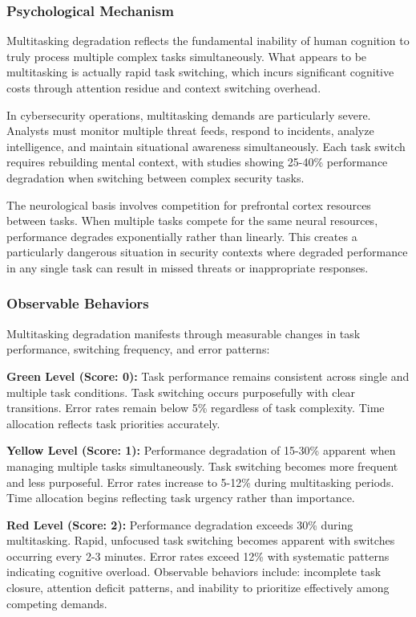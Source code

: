 \documentclass[11pt,a4paper]{article}
\begin{document}
\subsubsection{Psychological Mechanism}

Multitasking degradation reflects the fundamental inability of human cognition to truly process multiple complex tasks simultaneously\cite{pashler1994}. What appears to be multitasking is actually rapid task switching, which incurs significant cognitive costs through attention residue and context switching overhead.

In cybersecurity operations, multitasking demands are particularly severe. Analysts must monitor multiple threat feeds, respond to incidents, analyze intelligence, and maintain situational awareness simultaneously. Each task switch requires rebuilding mental context, with studies showing 25-40\% performance degradation when switching between complex security tasks\cite{rubinstein2001}.

The neurological basis involves competition for prefrontal cortex resources between tasks. When multiple tasks compete for the same neural resources, performance degrades exponentially rather than linearly. This creates a particularly dangerous situation in security contexts where degraded performance in any single task can result in missed threats or inappropriate responses.

\subsubsection{Observable Behaviors}

Multitasking degradation manifests through measurable changes in task performance, switching frequency, and error patterns:

\textbf{Green Level (Score: 0):} Task performance remains consistent across single and multiple task conditions. Task switching occurs purposefully with clear transitions. Error rates remain below 5\% regardless of task complexity. Time allocation reflects task priorities accurately.

\textbf{Yellow Level (Score: 1):} Performance degradation of 15-30\% apparent when managing multiple tasks simultaneously. Task switching becomes more frequent and less purposeful. Error rates increase to 5-12\% during multitasking periods. Time allocation begins reflecting task urgency rather than importance.

\textbf{Red Level (Score: 2):} Performance degradation exceeds 30\% during multitasking. Rapid, unfocused task switching becomes apparent with switches occurring every 2-3 minutes. Error rates exceed 12\% with systematic patterns indicating cognitive overload. Observable behaviors include: incomplete task closure, attention deficit patterns, and inability to prioritize effectively among competing demands.
\end{document}
